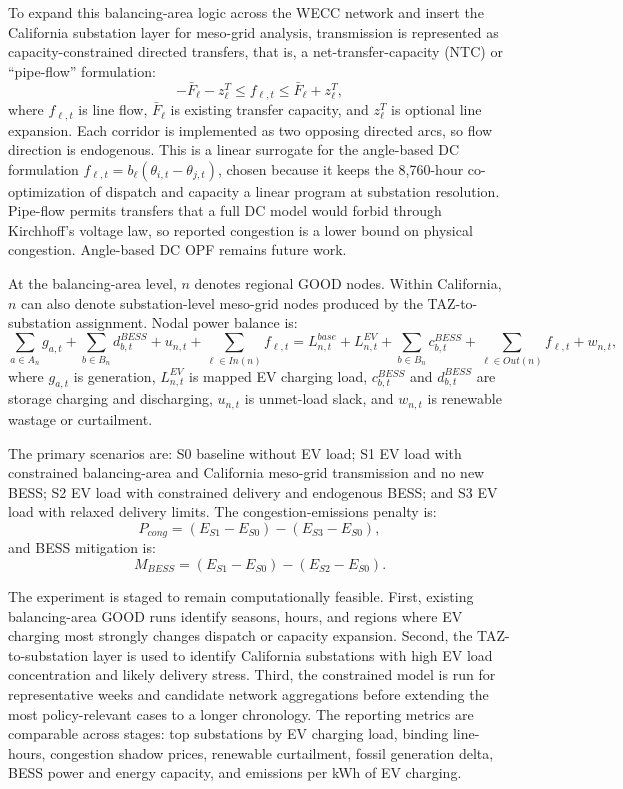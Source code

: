 \documentclass[11pt]{article}
\begin{document}
To expand this balancing-area logic across the WECC network and insert the California substation layer for meso-grid analysis, transmission is represented as capacity-constrained directed transfers, that is, a net-transfer-capacity (NTC) or ``pipe-flow'' formulation:
\[
-\bar F_{\ell}-z^T_{\ell} \leq f_{\ell,t} \leq \bar F_{\ell}+z^T_{\ell},
\]
where $f_{\ell,t}$ is line flow, $\bar F_{\ell}$ is existing transfer capacity, and $z^T_{\ell}$ is optional line expansion. Each corridor is implemented as two opposing directed arcs, so flow direction is endogenous. This is a linear surrogate for the angle-based DC formulation $f_{\ell,t}=b_{\ell}(\theta_{i,t}-\theta_{j,t})$, chosen because it keeps the 8{,}760-hour co-optimization of dispatch and capacity a linear program at substation resolution. Pipe-flow permits transfers that a full DC model would forbid through Kirchhoff's voltage law, so reported congestion is a lower bound on physical congestion. Angle-based DC OPF remains future work.

At the balancing-area level, $n$ denotes regional GOOD nodes. Within California, $n$ can also denote substation-level meso-grid nodes produced by the TAZ-to-substation assignment. Nodal power balance is:
\[
\sum_{a\in A_n}g_{a,t}+\sum_{b\in B_n}d^{BESS}_{b,t}+u_{n,t}
+\sum_{\ell\in In(n)}f_{\ell,t}
= L^{base}_{n,t}+L^{EV}_{n,t}
+\sum_{b\in B_n}c^{BESS}_{b,t}
+\sum_{\ell\in Out(n)}f_{\ell,t}+w_{n,t},
\]
where $g_{a,t}$ is generation, $L^{EV}_{n,t}$ is mapped EV charging load, $c^{BESS}_{b,t}$ and $d^{BESS}_{b,t}$ are storage charging and discharging, $u_{n,t}$ is unmet-load slack, and $w_{n,t}$ is renewable wastage or curtailment.

The primary scenarios are: S0 baseline without EV load; S1 EV load with constrained balancing-area and California meso-grid transmission and no new BESS; S2 EV load with constrained delivery and endogenous BESS; and S3 EV load with relaxed delivery limits. The congestion-emissions penalty is:
\[
P_{cong}=(E_{S1}-E_{S0})-(E_{S3}-E_{S0}),
\]
and BESS mitigation is:
\[
M_{BESS}=(E_{S1}-E_{S0})-(E_{S2}-E_{S0}).
\]

The experiment is staged to remain computationally feasible. First, existing balancing-area GOOD runs identify seasons, hours, and regions where EV charging most strongly changes dispatch or capacity expansion. Second, the TAZ-to-substation layer is used to identify California substations with high EV load concentration and likely delivery stress. Third, the constrained model is run for representative weeks and candidate network aggregations before extending the most policy-relevant cases to a longer chronology. The reporting metrics are comparable across stages: top substations by EV charging load, binding line-hours, congestion shadow prices, renewable curtailment, fossil generation delta, BESS power and energy capacity, and emissions per kWh of EV charging.
\end{document}
